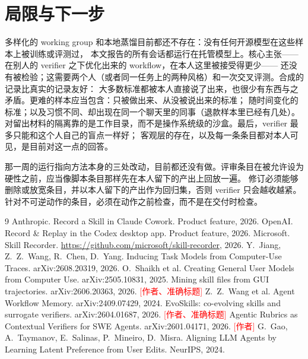 \documentclass[10pt,UTF8,scheme=plain]{ctexart}
\newcommand{\todo}[1]{\textcolor{red}{[#1]}}
\begin{document}
\section{局限与下一步}

多样化的 working group 和本地蒸馏目前都还不存在：没有任何开源模型在这些样本上被训练或评测过，
本文报告的所有会话都运行在托管模型上。核心主张——在别人的 verifier 之下优化出来的 workflow，在本人这里被接受得更少——
还没有被检验；这需要两个人（或者同一任务上的两种风格）和一次交叉评测。合成的记录比真实的记录友好：
大多数标准都被本人直接说了出来，也很少有东西与之矛盾。更难的样本应当包含：只被做出来、从没被说出来的标准；
随时间变化的标准；以及习惯不同、却出现在同一个聊天里的同事（退款样本里已经有几处）。
对留出材料的隔离靠的是工作目录，而不是操作系统级的沙盒。最后，verifier 最多只能和这个人自己的盲点一样好；
客观层的存在，以及每一条条目都对本人可见，是目前对这一点的回答。

那一周的运行指向方法本身的三处改动，目前都还没有做。评审条目在被允许设为硬性之前，应当像脚本条目那样先在本人留下的产出上回放一遍。
修订必须能够删除或放宽条目，并以本人留下的产出作为回归集，否则 verifier 只会越收越紧。
针对不可逆动作的条目，必须在动作之前检查，而不是在交付时检查。

\begin{thebibliography}{9}\small
{} Anthropic. Record a Skill in Claude Cowork. Product feature, 2026.
 OpenAI. Record \& Replay in the Codex desktop app. Product feature, 2026.
 Microsoft. Skill Recorder. \url{https://github.com/microsoft/skill-recorder}, 2026.
 Y.~Jiang, Z.~Z.~Wang, R.~Chen, D.~Yang. Inducing Task Models from Computer-Use Traces. arXiv:2608.20319, 2026.
 O.~Shaikh et al. Creating General User Models from Computer Use. arXiv:2505.10831, 2025.
 Mining skill files from GUI trajectories. arXiv:2606.20363, 2026. \todo{作者、准确标题}
 Z.~Z.~Wang et al. Agent Workflow Memory. arXiv:2409.07429, 2024.
 EvoSkills: co-evolving skills and surrogate verifiers. arXiv:2604.01687, 2026. \todo{作者、准确标题}
 Agentic Rubrics as Contextual Verifiers for SWE Agents. arXiv:2601.04171, 2026. \todo{作者}
 G.~Gao, A.~Taymanov, E.~Salinas, P.~Mineiro, D.~Misra. Aligning LLM Agents by Learning Latent Preference from User Edits. NeurIPS, 2024.
\end{thebibliography}
\end{document}
